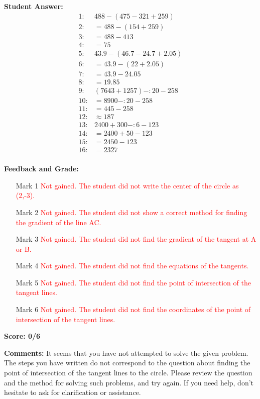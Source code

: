 \documentclass{article}
\begin{document}
\textbf{Student Answer:}
\begin{align*}
1: & 488-(475-321+259) \\
2: & =488-(154+259) \\
3: & =488-413 \\
4: & =75 \\
5: & 43.9-(46.7-24.7+2.05) \\
6: & =43.9-(22+2.05) \\
7: & =43.9-24.05 \\
8: & =19.85 \\
9: & (7643+1257)-:20-258 \\
10: & =8900-:20-258 \\
11: & =445-258 \\
12: & \approx 187 \\
13: & 2400+300-:6-123 \\
14: & =2400+50-123 \\
15: & =2450-123 \\
16: & =2327 \\
\end{align*}

\textbf{Feedback and Grade:}
\begin{itemize}
\item[Mark 1] \textcolor{red}{Not gained. The student did not write the center of the circle as (2,-3).}
\item[Mark 2] \textcolor{red}{Not gained. The student did not show a correct method for finding the gradient of the line AC.}
\item[Mark 3] \textcolor{red}{Not gained. The student did not find the gradient of the tangent at A or B.}
\item[Mark 4] \textcolor{red}{Not gained. The student did not find the equations of the tangents.}
\item[Mark 5] \textcolor{red}{Not gained. The student did not find the point of intersection of the tangent lines.}
\item[Mark 6] \textcolor{red}{Not gained. The student did not find the coordinates of the point of intersection of the tangent lines.}
\end{itemize}

\textbf{Score: 0/6}

\textbf{Comments:} It seems that you have not attempted to solve the given problem. The steps you have written do not correspond to the question about finding the point of intersection of the tangent lines to the circle. Please review the question and the method for solving such problems, and try again. If you need help, don't hesitate to ask for clarification or assistance.
\end{document}

